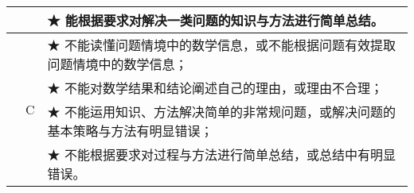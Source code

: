 \begin{itshape}
\begin{longtable}{|c|c|p{12cm}|}
   & &  ★ 能根据要求对解决一类问题的知识与方法进行简单总结。 \\    
\hline
\hline      

   &   \multirow{4}{*}{C}  &  ★ 不能读懂问题情境中的数学信息，或不能根据问题有效提取问题情境中的数学信息；\\  
   & &  ★ 不能对数学结果和结论阐述自己的理由，或理由不合理；\\  
   & &  ★ 不能运用知识、方法解决简单的非常规问题，或解决问题的基本策略与方法有明显错误； \\   
   & &  ★ 不能根据要求对过程与方法进行简单总结，或总结中有明显错误。 \\   
    
\hline 
\end{longtable}
\end{itshape}
